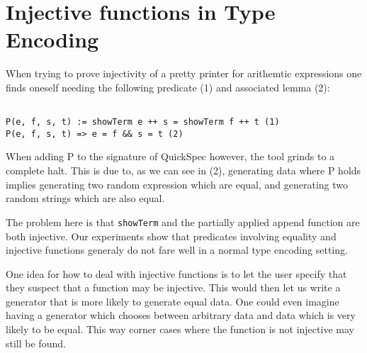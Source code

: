\section{Injective functions in Type Encoding}
When trying to prove injectivity of a pretty printer for arithemtic expressions one
finds oneself needing the following predicate (1) and associated lemma (2):
\begin{verbatim}

P(e, f, s, t) := showTerm e ++ s = showTerm f ++ t (1)
P(e, f, s, t) => e = f && s = t (2)

\end{verbatim}
When adding P to the signature of QuickSpec however, the tool grinds to a complete halt. This is
due to, as we can see in (2), generating data where P holds implies generating two
random expression which are equal, and generating two random strings which are also equal.

The problem here is that \texttt{showTerm} and the partially applied append function are both injective.
Our experiments show that predicates involving equality and injective functions generaly do not
fare well in a normal type encoding setting.

One idea for how to deal with injective functions is to let the user specify that they suspect that 
a function may be injective. This would then let us write a generator that is more likely to generate
equal data. One could even imagine having a generator which chooses between arbitrary data
and data which is very likely to be equal. This way corner cases where the function is not injective may
still be found.
